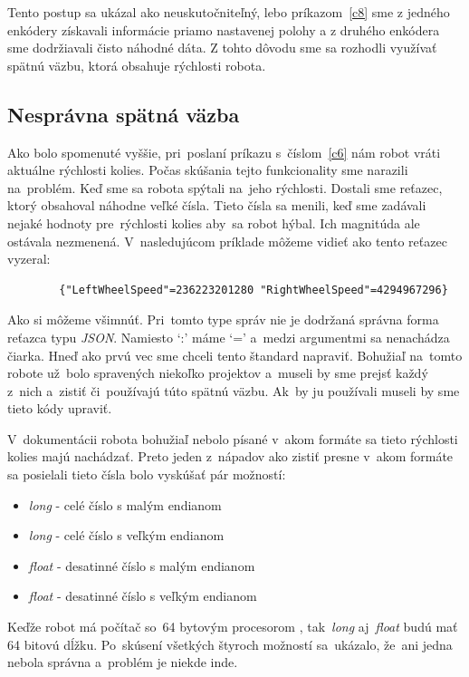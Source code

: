 Tento postup sa ukázal ako neuskutočniteľný, lebo príkazom~\ref{c8} sme z jedného enkódery
získavali informácie priamo nastavenej polohy a z druhého enkódera sme dodržiavali čisto náhodné dáta.
Z tohto dôvodu sme sa rozhodli využívať spätnú väzbu, ktorá obsahuje rýchlosti robota.

\subsection{Nesprávna spätná väzba}
\label{subsec:wrongFeedback}

Ako bolo spomenuté vyššie, pri~poslaní príkazu s~číslom~\ref{c6} nám robot vráti aktuálne rýchlosti kolies. Počas skúšania tejto funkcionality
sme narazili na~problém. Keď sme sa robota spýtali na~jeho rýchlosti. Dostali sme reťazec, ktorý obsahoval náhodne veľké čísla. Tieto čísla sa
menili, keď sme zadávali nejaké hodnoty pre~rýchlosti kolies aby~sa robot hýbal. Ich magnitúda ale ostávala nezmenená. V~nasledujúcom príklade
môžeme vidieť ako tento reťazec vyzeral:

\label{jsonWannabeSpeed}
\begin{lstlisting}
		{"LeftWheelSpeed"=236223201280 "RightWheelSpeed"=4294967296}
\end{lstlisting}

Ako si môžeme všimnúť. Pri~tomto type správ nie je dodržaná správna forma reťazca typu \textit{JSON}.
Namiesto `:' máme `=' a~medzi argumentmi sa nenachádza čiarka. Hneď ako prvú vec sme chceli tento štandard napraviť. Bohužiaľ na~tomto
robote už~bolo spravených niekoľko projektov a~museli by sme prejsť každý z~nich a~zistiť či~používajú túto spätnú väzbu. Ak~by ju používali
museli by sme tieto kódy upraviť.

V~dokumentácii robota bohužiaľ nebolo písané v~akom formáte sa tieto rýchlosti kolies majú nachádzať. Preto jeden z~nápadov ako zistiť presne
v~akom formáte sa posielali tieto čísla bolo vyskúšať pár možností:

\begin{itemize}
	\item \textit{long} - celé číslo s malým endianom
	\item \textit{long} - celé číslo s veľkým endianom
	\item \textit{float} - desatinné číslo s malým endianom
	\item \textit{float} - desatinné číslo s veľkým endianom
\end{itemize}

Keďže robot má počítač so~64 bytovým procesorom \cite{robotPc}, tak~\textit{long} aj~\textit{float} budú mať 64 bitovú dĺžku. Po~skúsení všetkých
štyroch možností sa~ukázalo, že~ani jedna nebola správna a~problém je niekde inde.


